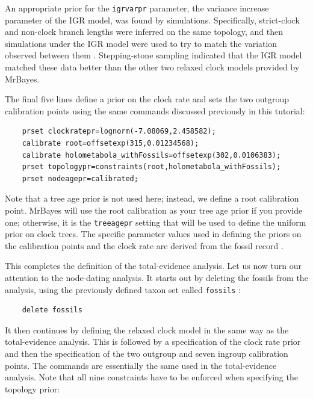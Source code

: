 \documentclass[12pt]{book}
\newcommand{\ttt}[1]{\texttt{#1} }
\begin{document}
An appropriate prior for the \ttt{igrvarpr} parameter, the variance increase parameter of the IGR
model, was found by simulations. Specifically, strict-clock and non-clock branch lengths were
inferred on the same topology, and then simulations under the IGR model were used to try to match
the variation observed between them \citep{ronquist12b}. Stepping-stone sampling indicated that the
IGR model matched these data better than the other two relaxed clock models provided by MrBayes.

The final five lines define a prior on the clock rate and sets the two outgroup calibration points
using the same commands discussed previously in this tutorial:

\begin{singlespacing}
\begin{verbatim}
    prset clockratepr=lognorm(-7.08069,2.458582);
    calibrate root=offsetexp(315,0.01234568);
    calibrate holometabola_withFossils=offsetexp(302,0.0106383);
    prset topologypr=constraints(root,holometabola_withFossils);
    prset nodeagepr=calibrated;
\end{verbatim}
\end{singlespacing}

Note that a tree age prior is not used here; instead, we define a root calibration point. MrBayes
will use the root calibration as your tree age prior if you provide one; otherwise, it is the
\ttt{treeagepr} setting that will be used to define the uniform prior on clock trees. The specific
parameter values used in defining the priors on the calibration points and the clock rate are
derived from the fossil record \citep{ronquist12b}.

This completes the definition of the total-evidence analysis. Let us now turn our attention to the
node-dating analysis.  It starts out by deleting the fossils from the analysis, using the
previously defined taxon set called \ttt{fossils}:

\begin{verbatim}
    delete fossils
\end{verbatim}

It then continues by defining the relaxed clock model in the same way as the total-evidence
analysis. This is followed by a specification of the clock rate prior and then the specification of
the two outgroup and seven ingroup calibration points. The commands are essentially the same used
in the total-evidence analysis. Note that all nine constraints have to be enforced when specifying
the topology prior:
\end{document}
